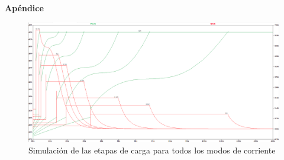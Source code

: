 \newpage
{}
\appendix
\begin{landscape}
\begin{center}
    \bfseries\LARGE Apéndice \par
\end{center}

\begin{figure}[hbt]
    \centering
    \includegraphics[width=\linewidth]{images/carga_completa_step.png}
    \caption{Simulación de las etapas de carga para todos los modos de corriente}
    \label{fig:simulacion_carga}
\end{figure}
    
\end{landscape}
\restoregeometry
